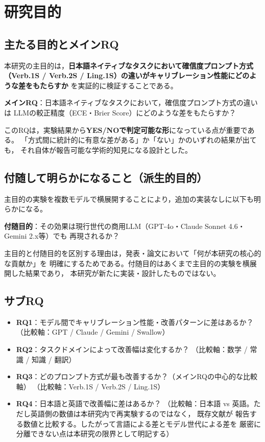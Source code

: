 \documentclass[11pt,a4paper,oneside]{article}
\begin{document}
\section{研究目的}

\subsection{主たる目的とメインRQ}

本研究の主目的は，\textbf{日本語ネイティブなタスクにおいて確信度プロンプト方式
（Verb.1S / Verb.2S / Ling.1S）の違いがキャリブレーション性能にどのような差をもたらすか}
を実証的に検証することである。

\textbf{メインRQ}：日本語ネイティブなタスクにおいて，確信度プロンプト方式の違いは
LLMの較正精度（ECE・Brier Score）にどのような差をもたらすか？

このRQは，実験結果から\textbf{YES/NOで判定可能な形}になっている点が重要である。
「方式間に統計的に有意な差がある」か「ない」かのいずれの結果が出ても，
それ自体が報告可能な学術的知見になる設計とした。

\subsection{付随して明らかになること（派生的目的）}

主目的の実験を複数モデルで横展開することにより，追加の実装なしに以下も明らかになる。

\textbf{付随目的}：その効果は現行世代の商用LLM（GPT-4o・Claude Sonnet 4.6・Gemini 2.x等）でも
再現されるか？

主目的と付随目的を区別する理由は，発表・論文において「何が本研究の核心的な貢献か」を
明確にするためである。付随目的はあくまで主目的の実験を横展開した結果であり，
本研究が新たに実装・設計したものではない。

\subsection{サブRQ}

\begin{itemize}
  \item \textbf{RQ1}：モデル間でキャリブレーション性能・改善パターンに差はあるか？
        （比較軸：GPT / Claude / Gemini / Swallow）
  \item \textbf{RQ2}：タスクドメインによって改善幅は変化するか？
        （比較軸：数学 / 常識 / 知識 / 翻訳）
  \item \textbf{RQ3}：どのプロンプト方式が最も改善するか？（メインRQの中心的な比較軸）
        （比較軸：Verb.1S / Verb.2S / Ling.1S）
  \item \textbf{RQ4}：日本語と英語で改善幅に差はあるか？
        （比較軸：日本語 vs 英語。ただし英語側の数値は本研究内で再実験するのではなく，
        既存文献\cite{tian2023justask,xiong2024llmuncertainty,xue2025mlingconf}が
        報告する数値と比較する。したがって言語による差とモデル世代による差を
        厳密に分離できない点は本研究の限界として明記する）
\end{itemize}
\end{document}
